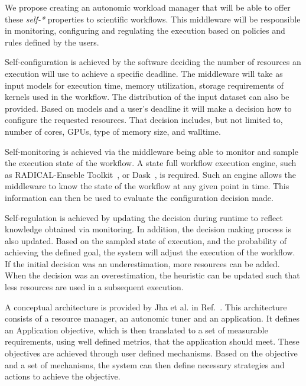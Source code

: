 We propose creating an autonomic workload manager that will be able to offer 
these \textit{self-*} properties to scientific workflows. This middleware will 
be responsible in monitoring, configuring and regulating the execution based on 
policies and rules defined by the users.

Self-configuration is achieved by the software deciding the number of resources 
an execution will use to achieve a specific deadline. The middleware will take 
as input models for execution time, memory utilization, storage requirements of 
kernels used in the workflow. The distribution of the input dataset can also be 
provided. Based on models and a user's deadline it will make a decision how to 
configure the requested resources. That decision includes, but not limited to, 
number of cores, GPUs, type of memory size, and walltime.

Self-monitoring is achieved via the middleware being able to monitor and sample 
the execution state of the workflow. A state full workflow execution engine,
such as RADICAL-Enseble Toolkit~\cite{balasubramanian2018harnessing}, or 
Dask~\cite{rocklin2015dask}, is required. Such an engine allows the middleware 
to know the state of the workflow at any given point in time. This information 
can then be used to evaluate the configuration decision made.

Self-regulation is achieved by updating the decision during runtime to reflect 
knowledge obtained via monitoring. In addition, the decision making process is 
also updated. Based on the sampled state of execution, and the probability of 
achieving the defined goal, the system will adjust the execution of the 
workflow. If the initial decision was an underestimation, more resources can be 
added. When the decision was an overestimation, the heuristic can be updated 
such that less resources are used in a subsequent execution.


A conceptual architecture is provided by Jha et al. in Ref.~\cite{jha2009self}. 
This architecture consists of a resource manager, an autonomic tuner and an 
application. It defines an Application objective, which is then translated to a 
set of measurable requirements, using well defined metrics, that the 
application should meet. These objectives are achieved through user defined 
mechanisms. Based on the objective and a set of mechanisms, the system can then 
define necessary strategies and actions to achieve the objective.

